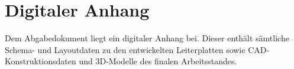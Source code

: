 \documentclass[main.tex]{subfiles} %
\begin{document}
\section{Digitaler Anhang}
Dem Abgabedokument liegt ein digitaler Anhang bei. Dieser enthält sämtliche 
Schema- und Layoutdaten zu den entwickelten Leiterplatten sowie 
CAD-Konstruktionsdaten und 3D-Modelle des finalen Arbeitsstandes.  
\end{document}
